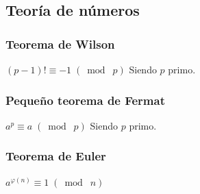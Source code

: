 \subsection{Teoría de números}
{
\subsubsection{Teorema de Wilson}
{
\(\displaystyle (p-1)! \equiv -1 \;(\bmod\; p) \)
Siendo $p$ primo.
}
\subsubsection{Pequeño teorema de Fermat}
{
\(\displaystyle a^p \equiv a \;(\bmod\; p) \)
Siendo $p$ primo.
}
\subsubsection{Teorema de Euler}
{
\(\displaystyle a^{\varphi(n)} \equiv 1 \;(\bmod\; n) \)
}
}
